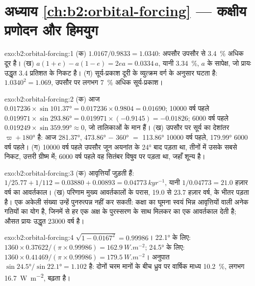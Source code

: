 \section*{अध्याय \ref{ch:b2:orbital-forcing} --- कक्षीय प्रणोदन और हिमयुग}

\begin{solution}{exo:b2:orbital-forcing:1}
(क) $1.0167/0.9833 = 1.0340$: अपसौर उपसौर से \qty{3.4}{\percent} अधिक दूर है।
(ख) $a(1 + e) - a(1 - e) = 2ea = 0.0334\,a$, यानी \qty{3.34}{\percent}, $a$ के सापेक्ष, जो प्रायः उद्धृत 3.4 प्रतिशत
के निकट है। (ग) सूर्य-प्रकाश दूरी के व्युत्क्रम वर्ग के अनुसार घटता है: $1.0340^2 = 1.069$,
उपसौर पर लगभग \qty{7}{\percent} अधिक सूर्य-प्रकाश।
\end{solution}

\begin{solution}{exo:b2:orbital-forcing:2}
(क) आज $0.017236 \times \sin\ang{101.37} = 0.017236 \times 0.9804 = 0.01690$; \num{10000} वर्ष पहले
$0.019971 \times \sin\ang{293.86} = 0.019971 \times (-0.9145) = -0.01826$; \num{6000} वर्ष पहले
$0.019249 \times \sin\ang{359.99} \approx 0$, जो तालिकाओं के मान हैं। (ख) उपसौर पर सूर्य का
देशांतर $\varpi + \ang{180}$ है: आज \ang{281.37}, \ang{473.86} $-$ \ang{360} $=$ \ang{113.86}
\num{10000} वर्ष पहले, \ang{179.99} \num{6000} वर्ष पहले। (ग) \num{10000} वर्ष पहले उपसौर
जून अयनांत के \ang{24} बाद पड़ता था, तीनों में उसके सबसे निकट, उत्तरी ग्रीष्म में;
\num{6000} वर्ष पहले वह सितंबर विषुव पर पड़ता था, जहाँ  शून्य है।
\end{solution}

\begin{solution}{exo:b2:orbital-forcing:3}
(क) आवृत्तियाँ जुड़ती हैं: $1/25.77 + 1/112 = 0.03880 + 0.00893 = \qty{0.04773}{kyr^{-1}}$, यानी
$1/0.04773 = 21.0$ हज़ार वर्ष का आवर्तकाल। (ख) परिणाम मुख्य आवर्तकालों के परास, 19.0 से 23.7 हज़ार
वर्ष, के भीतर पड़ता है। एक अकेली संख्या उन्हें पुनरुत्पन्न नहीं कर सकती: कक्षा का घूमना
स्वयं भिन्न आवृत्तियों वाली अनेक गतियों का योग है, जिनमें से हर एक अक्ष के पुरस्सरण के साथ
मिलकर  का एक आवर्तकाल देती है; औसत प्रायः उद्धृत
\num{23000} वर्ष है।
\end{solution}

\begin{solution}{exo:b2:orbital-forcing:4}
$\sqrt{1 - 0.0167^2} = 0.99986$। \ang{22.1} के लिए: $1360 \times 0.37622/(\pi \times 0.99986) =
\qty{162.9}{W.m^{-2}}$; \ang{24.5} के लिए: $1360 \times 0.41469/(\pi \times 0.99986) =
\qty{179.5}{W.m^{-2}}$। अनुपात $\sin\ang{24.5}/\sin\ang{22.1} = 1.102$ है: दोनों चरम मानों के बीच ध्रुव पर
वार्षिक माध्य \qty{10.2}{\percent}, लगभग \qty{16.7}{W.m^{-2}}, बढ़ता है।
\end{solution}

